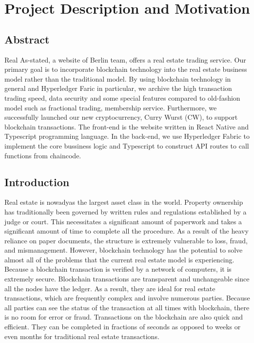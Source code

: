\chapter{\centering Project Description and Motivation} %

\label{Chapter Project Description} %
\section{Abstract} 
Real As-stated, a website of Berlin team, offers a real estate trading service.
Our primary goal is to incorporate blockchain technology into the real estate business model rather than the traditional model.
By using blockchain technology in general and Hyperledger Faric in particular, we archive the high transaction trading speed, data security and some special features compared to old-fashion model such as fractional trading, membership service.
Furthermore, we successfully launched our new cryptocurrency, Curry Wurst (CW), to support blockchain transactions.
The front-end is the website written in React Native and Typescript programming language.
In the back-end, we use Hyperledger Fabric to implement the core bussiness logic and Typescript to construct API routes to call functions from chaincode.
\section{Introduction}
Real estate is nowadyas the largest asset class in the world. 
Property ownership has traditionally been governed by written rules and regulations established by a judge or court.
This necessitates a significant amount of paperwork and takes a significant amount of time to complete all the procedure.
As a result of the heavy reliance on paper documents, the structure is extremely vulnerable to loss, fraud, and mismanagement.
However, blockchain technology has the potential to solve almost all of the problems that the current real estate model is experiencing. \\
Because a blockchain transaction is verified by a network of computers, it is extremely secure. 
Blockchain transactions are transparent and unchangeable since all the nodes have the ledger. 
As a result, they are ideal for real estate transactions, which are frequently complex and involve numerous parties. 
Because all parties can see the status of the transaction at all times with blockchain, there is no room for error or fraud. 
Transactions on the blockchain are also quick and efficient. 
They can be completed in fractions of seconds as opposed to weeks or even months for traditional real estate transactions.